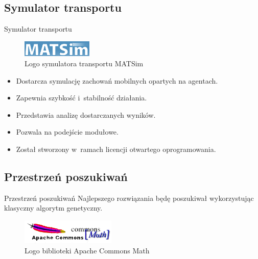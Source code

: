 \documentclass{beamer}
\begin{document}
\subsection{Symulator transportu}
\begin{frame}{Symulator transportu} 

\begin{figure}[b]
\includegraphics[width=0.30\textwidth]{img/matsim}
\caption{Logo symulatora transportu MATSim}
\end{figure}

\begin{itemize}
\item{Dostarcza symulację zachowań mobilnych opartych na agentach.} 
\item{Zapewnia szybkość i~stabilność działania.} 
\item{Przedstawia analizę dostarczanych wyników.} 
\item{Pozwala na podejście modułowe.} 
\item{Został stworzony w~ramach licencji otwartego oprogramowania.} 
\end{itemize}

\end{frame}

\subsection{Przestrzeń poszukiwań}
\begin{frame}{Przestrzeń poszukiwań} 
Najlepszego rozwiązania będę poszukiwał wykorzystując klasyczny algorytm genetyczny.

	\begin{figure}[b]
	\includegraphics[width=0.40\textwidth]{img/math}
	\caption{Logo biblioteki Apache Commons Math}
	\end{figure}

\end{frame}
\end{document}
